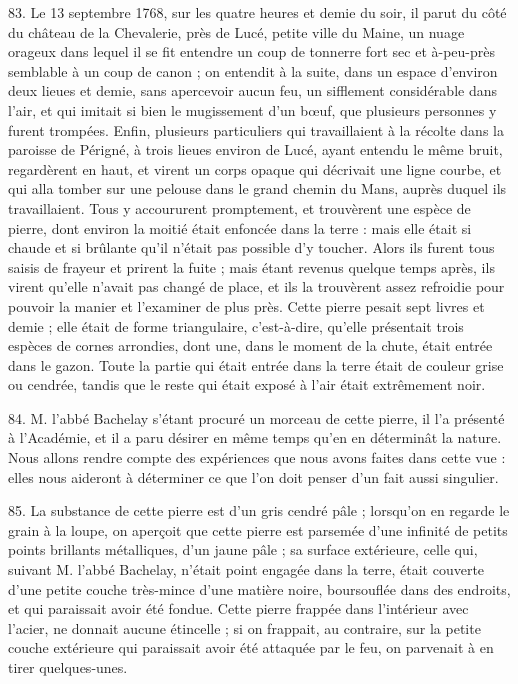 \documentclass[a4paper, 11pt, oneside, polutonikogreek, french]{article}
\begin{document}
83. Le 13 septembre 1768, sur les quatre heures et demie du soir, il parut du côté du château de la Chevalerie, près de Lucé, petite ville du Maine, un nuage orageux dans lequel il se fit entendre un coup de tonnerre fort sec et à-peu-près semblable à un coup de canon ; on entendit à la suite, dans un espace d'environ deux lieues et demie, sans apercevoir aucun feu, un sifflement considérable dans l'air, et qui imitait si bien le mugissement d'un bœuf, que plusieurs personnes y furent trompées. Enfin, plusieurs particuliers qui travaillaient à la récolte dans la paroisse de Périgné, à trois lieues environ de Lucé, ayant entendu le même bruit, regardèrent en haut, et virent un corps opaque qui décrivait une ligne courbe, et qui alla tomber sur une pelouse dans le grand chemin du Mans, auprès duquel ils travaillaient. Tous y accoururent promptement, et trouvèrent une espèce de pierre, dont environ la moitié était enfoncée dans la terre : mais elle était si chaude et si brûlante qu'il n'était pas possible d'y toucher. Alors ils furent tous saisis de frayeur et prirent la fuite ; mais étant revenus quelque temps après, ils virent qu'elle n'avait pas changé de place, et ils la trouvèrent assez refroidie pour pouvoir la manier et l'examiner de plus près. Cette pierre pesait sept livres et demie ; elle était de forme triangulaire, c'est-à-dire, qu'elle présentait trois espèces de cornes arrondies, dont une, dans le moment de la chute, était entrée dans le gazon. Toute la partie qui était entrée dans la terre était de couleur grise ou cendrée, tandis que le reste qui était exposé à l'air était extrêmement noir.

84. M. l'abbé Bachelay s'étant procuré un morceau de cette pierre, il l'a présenté à l'Académie, et il a paru désirer en même temps qu'en en déterminât la nature. Nous allons rendre compte des expériences que nous avons faites dans cette vue : elles nous aideront à déterminer ce que l'on doit penser d'un fait aussi singulier.

85. La substance de cette pierre est d'un gris cendré pâle ; lorsqu'on en regarde le grain à la loupe, on aperçoit que cette pierre est parsemée d'une infinité de petits points brillants métalliques, d'un jaune pâle ; sa surface extérieure, celle qui, suivant M. l'abbé Bachelay, n'était point engagée dans la terre, était couverte d'une petite couche très-mince d'une matière noire, boursouflée dans des endroits, et qui paraissait avoir été fondue. Cette pierre frappée dans l'intérieur avec l'acier, ne donnait aucune étincelle ; si on frappait, au contraire, sur la petite couche extérieure qui paraissait avoir été attaquée par le feu, on parvenait à en tirer quelques-unes.
\end{document}
